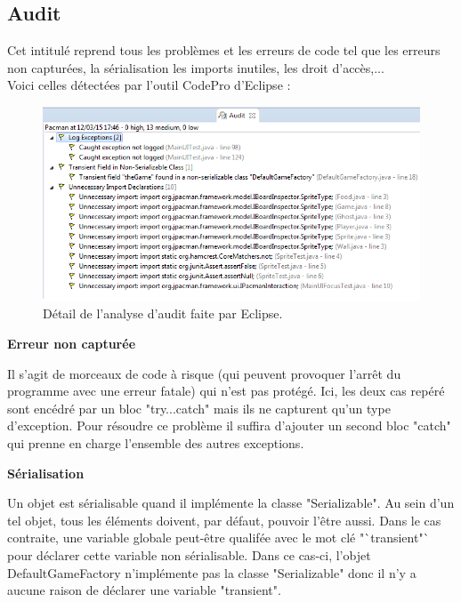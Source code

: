 \documentclass[12pt,a4paper,final]{article}
\newcommand{\smalltitle}[1]{\bigskip\large\textbf{#1}\par\normalsize\medskip}
\begin{document}
\subsection{Audit}
Cet intitulé reprend tous les problèmes et les erreurs de code tel que les erreurs non capturées, la sérialisation les imports inutiles, les droit d'accès,...\\
Voici celles détectées par l'outil CodePro d'Eclipse : 
\begin{figure}[!h]
	\centering
	\includegraphics[width=\textwidth]{Audit.png}
	\caption{\label{Audit}Détail de l'analyse d'audit faite par Eclipse.}
\end{figure}

\smalltitle{Erreur non capturée}
Il s'agit de morceaux de code à risque (qui peuvent provoquer l'arrêt du programme avec une erreur fatale) qui n'est pas protégé.
Ici, les deux cas repéré sont encédré par un bloc "try...catch" mais ils ne capturent qu'un type d'exception. Pour résoudre ce problème il suffira d'ajouter un second bloc "catch" qui prenne en charge l'ensemble des autres exceptions.

\smalltitle{Sérialisation}
Un objet est sérialisable quand il implémente la classe "Serializable". Au sein d'un tel objet, tous les éléments doivent, par défaut, pouvoir l'être aussi. Dans le cas contraite, une variable globale peut-être qualifée avec le mot clé "`transient"` pour déclarer cette variable non sérialisable.
Dans ce cas-ci, l'objet DefaultGameFactory n'implémente pas la classe "Serializable" donc il n'y a aucune raison de déclarer une variable "transient".
\end{document}
